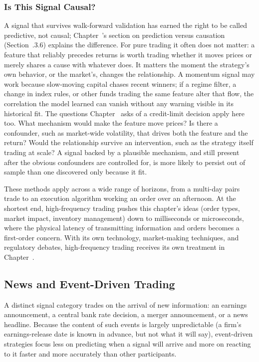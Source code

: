 \documentclass[../ai_in_finance]{subfiles}
\begin{document}
\subsubsection*{Is This Signal Causal?}

A signal that survives walk-forward validation has earned the right to be called predictive, not causal; Chapter~'s section on prediction versus causation (Section~.3.6) explains the difference. For pure trading it often does not matter: a feature that reliably precedes returns is worth trading whether it moves prices or merely shares a cause with whatever does. It matters the moment the strategy's own behavior, or the market's, changes the relationship. A momentum signal may work because slow-moving capital chases recent winners; if a regime filter, a change in index rules, or other funds trading the same feature alter that flow, the correlation the model learned can vanish without any warning visible in its historical fit. The questions Chapter~ asks of a credit-limit decision apply here too. What mechanism would make the feature move prices? Is there a confounder, such as market-wide volatility, that drives both the feature and the return? Would the relationship survive an intervention, such as the strategy itself trading at scale? A signal backed by a plausible mechanism, and still present after the obvious confounders are controlled for, is more likely to persist out of sample than one discovered only because it fit.

These methods apply across a wide range of horizons, from a multi-day pairs trade to an execution algorithm working an order over an afternoon. At the shortest end, high-frequency trading pushes this chapter's ideas (order types, market impact, inventory management) down to milliseconds or microseconds, where the physical latency of transmitting information and orders becomes a first-order concern. With its own technology, market-making techniques, and regulatory debates, high-frequency trading receives its own treatment in Chapter~.

\subsection{News and Event-Driven Trading}

A distinct signal category trades on the arrival of new information: an earnings announcement, a central bank rate decision, a merger announcement, or a news headline. Because the content of such events is largely unpredictable (a firm's earnings-release date is known in advance, but not what it will say), event-driven strategies focus less on predicting when a signal will arrive and more on reacting to it faster and more accurately than other participants.
\end{document}
